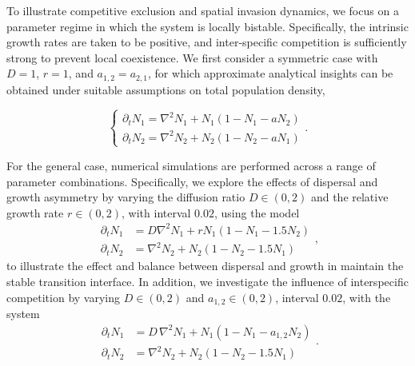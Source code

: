         To illustrate competitive exclusion and spatial invasion dynamics, we focus on a parameter regime in which the system is locally bistable. Specifically, the intrinsic growth rates are taken to be positive, and inter-specific competition is sufficiently strong to prevent local coexistence. We first consider a symmetric case with $D = 1$, $r = 1$, and $a_{1,2} = a_{2,1}$, for which approximate analytical insights can be obtained under suitable assumptions on total population density,
        
        \begin{equation}
            \label{eqn:symme_2_species}
            \begin{cases}
                \partial_t N_{1} = \nabla^2 N_1 + N_1(1 - N_1 - a N_2)\\
                \partial_t N_{2} = \nabla^2 N_2 + N_2(1 - N_2 - a N_1)
            \end{cases}.
        \end{equation}

        For the general case, numerical simulations are performed across a range of parameter combinations. Specifically, we explore the effects of dispersal and growth asymmetry by varying the diffusion ratio $D \in (0,2)$ and the relative growth rate $r \in (0,2)$, with interval $0.02$, using the model
        \begin{equation*}\label{eqn:balance_D-r}
            \begin{aligned}
                \partial_t N_1 &= D \nabla^2 N_1 + r N_1(1 - N_1 - 1.5 N_2)\\
                \partial_t N_2 &= \nabla^2 N_2 + N_2(1 - N_2 - 1.5 N_1)
            \end{aligned},
        \end{equation*}
        to illustrate the effect and balance between dispersal and growth in maintain the stable transition interface.
        In addition, we investigate the influence of interspecific competition by varying $D \in (0,2)$ and $a_{1,2} \in (0,2)$, interval $0.02$, with the system
        \begin{equation*}\label{eqn:balance_D-a}
            \begin{aligned}
                \partial_t N_1 &= D \, \nabla^2 N_1 + N_1(1 - N_1 - a_{1,2} N_2)\\
                \partial_t N_2 &= \nabla^2 N_2 + N_2(1 - N_2 - 1.5 N_1)
            \end{aligned}.
        \end{equation*}


